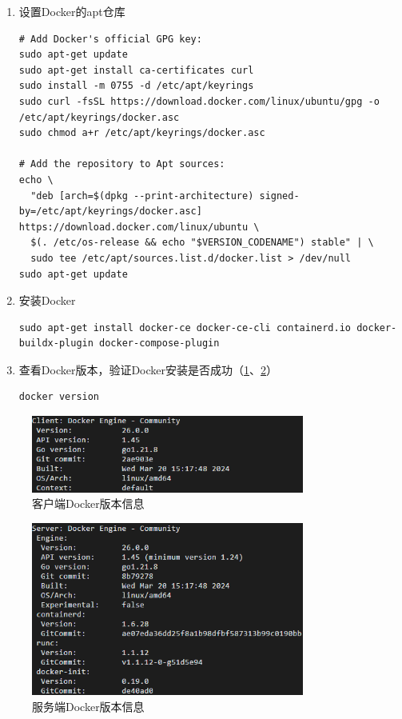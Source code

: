 \begin{enumerate}
    \item 设置Docker的apt仓库
          \begin{verbatim}
# Add Docker's official GPG key:
sudo apt-get update
sudo apt-get install ca-certificates curl
sudo install -m 0755 -d /etc/apt/keyrings
sudo curl -fsSL https://download.docker.com/linux/ubuntu/gpg -o /etc/apt/keyrings/docker.asc
sudo chmod a+r /etc/apt/keyrings/docker.asc

# Add the repository to Apt sources:
echo \
  "deb [arch=$(dpkg --print-architecture) signed-by=/etc/apt/keyrings/docker.asc] https://download.docker.com/linux/ubuntu \
  $(. /etc/os-release && echo "$VERSION_CODENAME") stable" | \
  sudo tee /etc/apt/sources.list.d/docker.list > /dev/null
sudo apt-get update
          \end{verbatim}
    \item 安装Docker
          \begin{verbatim}
sudo apt-get install docker-ce docker-ce-cli containerd.io docker-buildx-plugin docker-compose-plugin
          \end{verbatim}
    \item 查看Docker版本，验证Docker安装是否成功（\cref{fig:ClientDockerVersion}、\cref{fig:ServerDockerVersion}）
          \begin{verbatim}
docker version
          \end{verbatim}
\end{enumerate}

\begin{figure}[htbp]
    \centering
    \includegraphics[width=0.8\textwidth]{figures/ClientDockerVersion.png}
    \caption{客户端Docker版本信息}
    \label{fig:ClientDockerVersion}
\end{figure}

\begin{figure}[htbp]
    \centering
    \includegraphics[width=0.8\textwidth]{figures/ServerDockerVersion.png}
    \caption{服务端Docker版本信息}
    \label{fig:ServerDockerVersion}
\end{figure}


